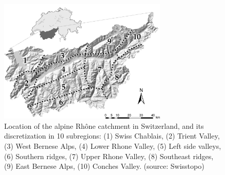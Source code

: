 \documentclass{ametsoc}
\begin{document}
%




%


\begin{figure}[t]
	\centerline{\includegraphics[width=19pc,angle=0]{fig01.pdf}}
	\caption{Location of the alpine Rh\^{o}ne catchment in Switzerland, and its discretization in 10 subregions:	(1) Swiss Chablais, (2) Trient Valley, (3) West Bernese Alps, (4) Lower Rhone Valley, (5) Left side valleys, (6) Southern ridges, (7) Upper Rhone Valley, (8) Southeast ridges, (9) East Bernese Alps, (10) Conches Valley. (source: Swisstopo)}
	\label{fig:map}
\end{figure}
\end{document}
